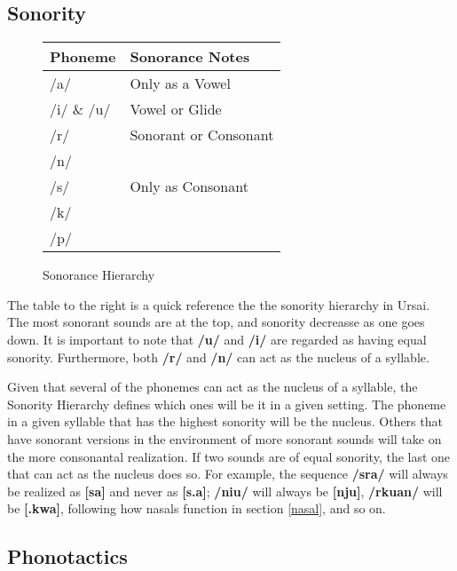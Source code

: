 \documentclass[11pt,letterpaper]{article}
\makeatletter
\newcommand{\engma}{\textipa{N}}
\newcommand{\rson}{\textipa{@}\textrhoticity}
\newcommand{\flap}{\textipa{R}}
\makeatother
\begin{document}
	\subsection{Sonority}\label{sonority}
		\begin{wrapfigure}{r}{0.4\textwidth}
  			\begin{tabular}{|l|l|}
  				\hline
  				Phoneme    & Sonorance Notes \\ \hline \hline
  				/a/        & Only as a Vowel \\ \hline
  				/i/ \& /u/ & Vowel or Glide  \\ \hline
  				/r/        & Sonorant or Consonant\\ 
  				/n/        &                 \\ \hline
  				/s/        & Only as Consonant\\
  				/k/        &  \\
  				/p/        &  \\ \hline
  			\end{tabular}
  			\caption{Sonorance Hierarchy}
		\end{wrapfigure}
		\par
		The table to the right is a quick reference the the sonority hierarchy in Ursai.  The most sonorant sounds are at the top, and sonority decreasse as one goes down.  It is important to note that \textbf{/u/} and \textbf{/i/} are regarded as having equal sonority.  Furthermore, both \textbf{/r/} and \textbf{/n/} can act as the nucleus of a syllable.
		\par
		Given that several of the phonemes can act as the nucleus of a syllable, the Sonority Hierarchy defines which ones will be it in a given setting.  The phoneme in a given syllable that has the highest sonority will be the nucleus.  Others that have sonorant versions in the environment of more sonorant sounds will take on the more consonantal realization.  If two sounds are of equal sonority, the last one that can act as the nucleus does so.  For example, the sequence \textbf{/sra/} will always be realized as \textbf{[s\flap a]} and never as \textbf{[s\rson .a]}; \textbf{/niu/} will always be \textbf{[nju]}, \textbf{/rkuan/} will be \textbf{[\rson .kwa\engma]}, following how nasals function in section \ref{nasal}, and so on.
		
	\subsection{Phonotactics}
\end{document}
